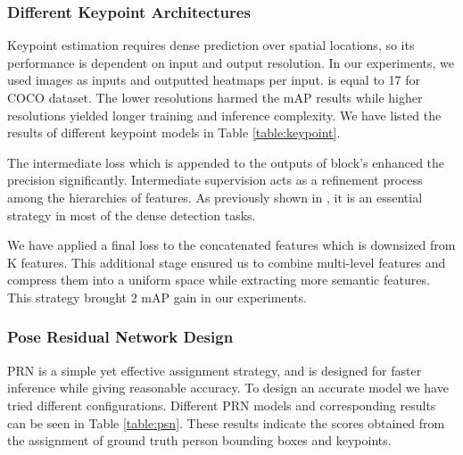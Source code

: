 \documentclass[runningheads]{llncs}
\begin{document}
\subsubsection{Different Keypoint Architectures}
Keypoint estimation requires dense prediction over spatial locations, so its performance is dependent on input and output resolution. In our experiments, we used  images as inputs and outputted  heatmaps per input.  is equal to 17 for COCO dataset. The lower resolutions harmed the mAP results while higher resolutions yielded longer training and inference complexity. We have listed the results of different keypoint models in Table \ref{table:keypoint}. 


The intermediate loss which is appended to the outputs of  block’s enhanced the precision significantly. Intermediate supervision acts as a refinement process among the hierarchies of features. As previously shown in \cite{Cao2016,Newella,Wei2016}, it is an essential strategy in most of the dense detection tasks.


We have applied a final loss to the concatenated  features which is downsized from K features. This additional stage ensured us to combine multi-level features and compress them into a uniform space while extracting more semantic features. This strategy brought 2 mAP gain in our experiments. 
\subsubsection{Pose Residual Network Design} 
PRN is a simple yet effective assignment strategy, and is designed for faster inference while giving reasonable accuracy. To design an accurate model we have tried different configurations. Different PRN models and corresponding results can be seen in Table \ref{table:psn}. These results indicate the scores obtained from the assignment of ground truth person bounding boxes and keypoints. 
\end{document}
